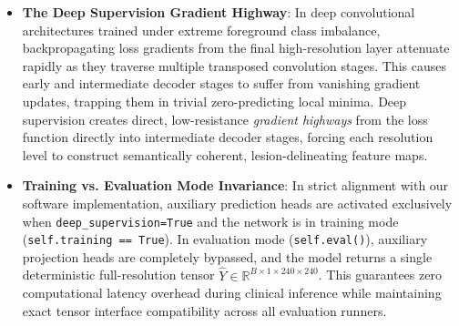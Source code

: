 \documentclass{article}
\begin{document}
\begin{itemize}
    The multi-scale loss is computed using normalized exponential decay weights:
    \begin{equation}
        \mathcal{L}_{\text{deep\_sup}} = \sum_{s=1}^S w_s \cdot \left[ \mathcal{L}_{\text{Dice}}(\hat{Y}_s, Y_s) + \mathcal{L}_{\text{BCE}}(\hat{Y}_s, Y_s) \right], \qquad w_s = \frac{2^{-(s-1)}}{\sum_{j=1}^S 2^{-(j-1)}}
    \end{equation}
    For $S = 4$ stages, the raw weights $(1.0, 0.5, 0.25, 0.125)$ sum to $1.875$, yielding normalized weights $(0.533, 0.267, 0.133, 0.067)$. Normalizing weights ensures that the effective gradient scale remains identical to single-resolution training, preventing learning rate instability.
    \item \textbf{The Deep Supervision Gradient Highway}: In deep convolutional architectures trained under extreme foreground class imbalance, backpropagating loss gradients from the final high-resolution layer attenuate rapidly as they traverse multiple transposed convolution stages. This causes early and intermediate decoder stages to suffer from vanishing gradient updates, trapping them in trivial zero-predicting local minima. Deep supervision creates direct, low-resistance \emph{gradient highways} from the loss function directly into intermediate decoder stages, forcing each resolution level to construct semantically coherent, lesion-delineating feature maps.
    \item \textbf{Training vs. Evaluation Mode Invariance}: In strict alignment with our software implementation, auxiliary prediction heads are activated exclusively when \texttt{deep\_supervision=True} and the network is in training mode (\texttt{self.training == True}). In evaluation mode (\texttt{self.eval()}), auxiliary projection heads are completely bypassed, and the model returns a single deterministic full-resolution tensor $\hat{Y} \in \mathbb{R}^{B \times 1 \times 240 \times 240}$. This guarantees zero computational latency overhead during clinical inference while maintaining exact tensor interface compatibility across all evaluation runners.
\end{itemize}
\end{document}
